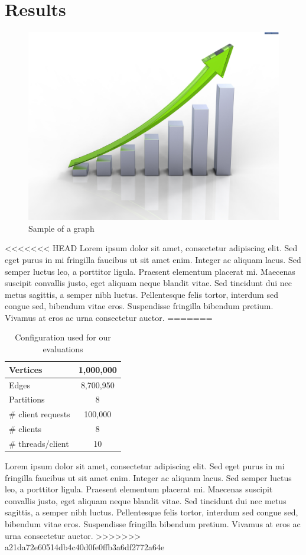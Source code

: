 
\section{Results}
\label{sec:results}

\begin{figure}

\includegraphics[keepaspectratio, width=0.35\textheight]
{./img/graph.jpg}
\caption{Sample of a graph}
\label{fig:graph}
\end{figure}

<<<<<<< HEAD
Lorem ipsum dolor sit amet, consectetur adipiscing elit. Sed eget purus in mi fringilla faucibus ut sit amet enim. Integer ac aliquam lacus. Sed semper luctus leo, a porttitor ligula. Praesent elementum placerat mi. Maecenas suscipit convallis justo, eget aliquam neque blandit vitae. Sed tincidunt dui nec metus sagittis, a semper nibh luctus. Pellentesque felis tortor, interdum sed congue sed, bibendum vitae eros. Suspendisse fringilla bibendum pretium. Vivamus at eros ac urna consectetur auctor.
=======
\begin{table}
\centering
\begin{tabular}{ | l | c | }
	\hline
	Vertices & 1,000,000 \\ \hline
	Edges & 8,700,950 \\ \hline
	Partitions & 8 \\ \hline
	\# client requests & 100,000 \\ \hline
	\# clients & 8 \\ \hline
	\# threads/client & 10 \\ \hline
\end{tabular}
\caption{Configuration used for our evaluations}
\label{tbl:graphconfig}
\end{table}

Lorem ipsum dolor sit amet, consectetur adipiscing elit. Sed eget purus in mi fringilla faucibus ut sit amet enim. Integer ac aliquam lacus. Sed semper luctus leo, a porttitor ligula. Praesent elementum placerat mi. Maecenas suscipit convallis justo, eget aliquam neque blandit vitae. Sed tincidunt dui nec metus sagittis, a semper nibh luctus. Pellentesque felis tortor, interdum sed congue sed, bibendum vitae eros. Suspendisse fringilla bibendum pretium. Vivamus at eros ac urna consectetur auctor.
>>>>>>> a21da72e60514db4c40d0fe0ffb3a6df2772a64e
